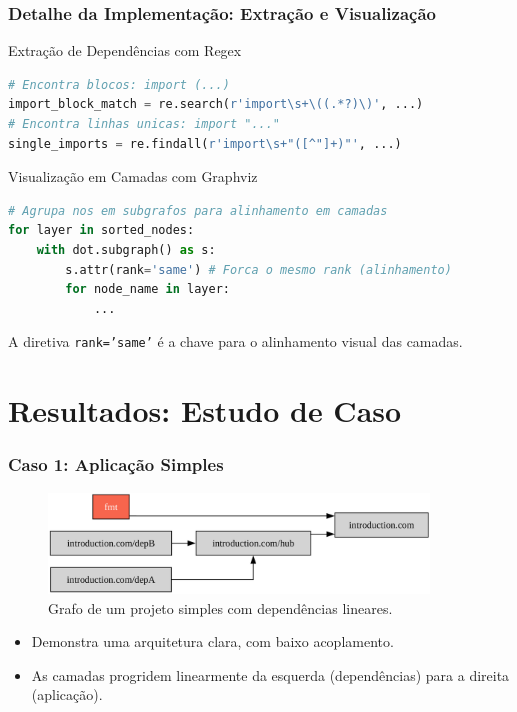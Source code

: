 \documentclass{beamer}
\begin{document}
\begin{frame}[fragile]
    \frametitle{Detalhe da Implementação: Extração e Visualização}
    
    \begin{exampleblock}{Extração de Dependências com Regex}
        \begin{lstlisting}[language=Python, basicstyle=\tiny\ttfamily]
# Encontra blocos: import (...)
import_block_match = re.search(r'import\s+\((.*?)\)', ...)
# Encontra linhas unicas: import "..."
single_imports = re.findall(r'import\s+"([^"]+)"', ...)
        \end{lstlisting}
    \end{exampleblock}

    \begin{exampleblock}{Visualização em Camadas com Graphviz}
        \begin{lstlisting}[language=Python, basicstyle=\tiny\ttfamily]
# Agrupa nos em subgrafos para alinhamento em camadas
for layer in sorted_nodes:
    with dot.subgraph() as s:
        s.attr(rank='same') # Forca o mesmo rank (alinhamento)
        for node_name in layer:
            ...
        \end{lstlisting}
    \end{exampleblock}
    A diretiva \texttt{rank='same'} é a chave para o alinhamento visual das camadas.
\end{frame}


\section{Resultados: Estudo de Caso}
\begin{frame}
  \frametitle{Caso 1: Aplicação Simples}
    \begin{figure}
        \includegraphics[width=0.9\textwidth]{images/init_example.png}
        \caption{Grafo de um projeto simples com dependências lineares.}
    \end{figure}
    \begin{itemize}
        \item Demonstra uma arquitetura clara, com baixo acoplamento.
        \item As camadas progridem linearmente da esquerda (dependências) para a direita (aplicação).
    \end{itemize}
\end{frame}
\end{document}
